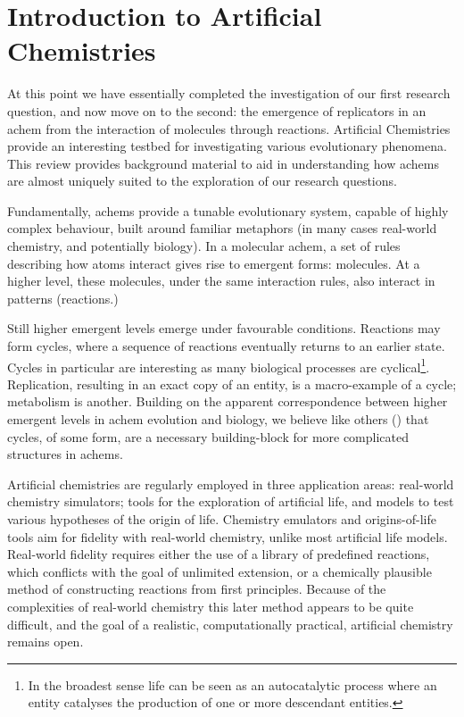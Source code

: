 \chapter{Introduction to Artificial Chemistries}\label{introduction-to-achems}

At this point we have essentially completed the investigation of our first research question, and now move on to the second: the emergence of replicators in an \gls{achem} from the interaction of molecules through reactions. Artificial Chemistries provide an interesting testbed for investigating various evolutionary phenomena. This review  provides background material to aid in understanding how \glspl{achem} are almost uniquely suited to the exploration of our research questions.

Fundamentally, \glspl{achem} provide a tunable evolutionary system, capable of highly complex behaviour, built around familiar metaphors (in many cases real-world chemistry, and potentially biology). In a molecular \gls{achem}, a set of rules describing how atoms interact gives rise to emergent forms: molecules. At a higher level, these molecules, under the same interaction rules, also interact in patterns (reactions.)

Still higher emergent levels emerge under favourable conditions. Reactions may form cycles, where a sequence of reactions eventually returns to an earlier state. Cycles in particular are interesting as many biological processes are cyclical\footnote{In the broadest sense life can be seen as an autocatalytic process where an entity catalyses the production of one or more descendant entities.}. Replication, resulting in an exact copy of an entity, is a macro-example of a cycle; metabolism is another. Building on the apparent correspondence between higher emergent levels in \gls{achem} evolution and biology, we believe like others (\eg \textcite{Steel2013}) that cycles, of some form, are a necessary building-block for more complicated structures in \glspl{achem}.

Artificial chemistries are regularly employed in three application areas: real-world chemistry simulators; tools for the exploration of artificial life, and models to test various hypotheses of the origin of life. Chemistry emulators and origins-of-life tools aim for fidelity with real-world chemistry, unlike most artificial life models. Real-world fidelity requires either the use of a library of predefined reactions, which conflicts with the goal of unlimited extension, or a chemically plausible method of constructing reactions from first principles. Because of the complexities of real-world chemistry this later method appears to be quite difficult, and the goal of a realistic, computationally practical, artificial chemistry remains open. 

